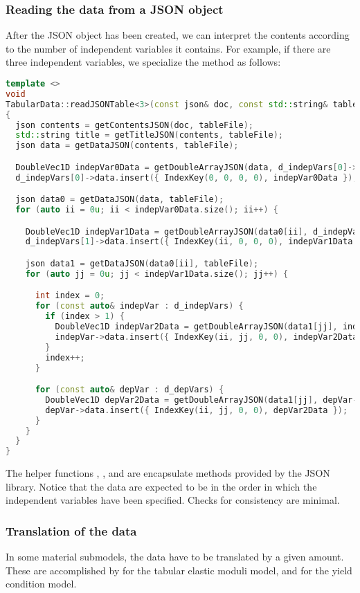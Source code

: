 \subsubsection{Reading the data from a JSON object}
After the JSON object has been created, we can interpret the contents according
to the number of independent variables it contains.  For example, if there
are three independent variables, we specialize the  method
as follows:
\begin{lstlisting}[language=Cpp]
template <>
void
TabularData::readJSONTable<3>(const json& doc, const std::string& tableFile)
{
  json contents = getContentsJSON(doc, tableFile);
  std::string title = getTitleJSON(contents, tableFile);
  json data = getDataJSON(contents, tableFile);

  DoubleVec1D indepVar0Data = getDoubleArrayJSON(data, d_indepVars[0]->name, tableFile);
  d_indepVars[0]->data.insert({ IndexKey(0, 0, 0, 0), indepVar0Data });

  json data0 = getDataJSON(data, tableFile);
  for (auto ii = 0u; ii < indepVar0Data.size(); ii++) {

    DoubleVec1D indepVar1Data = getDoubleArrayJSON(data0[ii], d_indepVars[1]->name, tableFile);
    d_indepVars[1]->data.insert({ IndexKey(ii, 0, 0, 0), indepVar1Data });

    json data1 = getDataJSON(data0[ii], tableFile);
    for (auto jj = 0u; jj < indepVar1Data.size(); jj++) {

      int index = 0;
      for (const auto& indepVar : d_indepVars) {
        if (index > 1) {
          DoubleVec1D indepVar2Data = getDoubleArrayJSON(data1[jj], indepVar->name, tableFile);
          indepVar->data.insert({ IndexKey(ii, jj, 0, 0), indepVar2Data });
        }
        index++;
      }

      for (const auto& depVar : d_depVars) {
        DoubleVec1D depVar2Data = getDoubleArrayJSON(data1[jj], depVar->name, tableFile);
        depVar->data.insert({ IndexKey(ii, jj, 0, 0), depVar2Data });
      }
    }
  }
}
\end{lstlisting}
The helper functions , , and 
are encapsulate  methods provided by the JSON library.  Notice that the data are
expected to be in the order in which the independent variables have been specified.  Checks for
consistency are minimal.

\subsubsection{Translation of the data}
In some material submodels, the data have to be translated by a given amount.  These 
are accomplished by  for the tabular elastic moduli model,
and  for the yield condition model.

